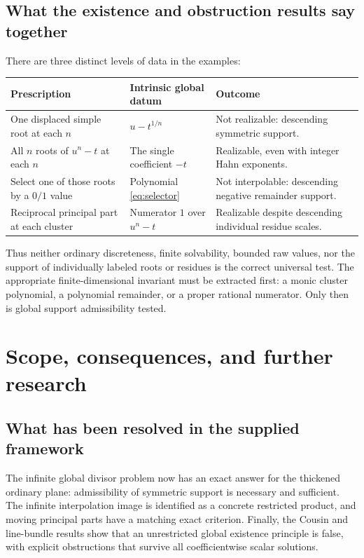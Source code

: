 \documentclass[11pt,letterpaper]{article}
\theoremstyle{definition}
\theoremstyle{remark}
\numberwithin{equation}{section}
\begin{document}
\subsection{What the existence and obstruction results say together}
There are three distinct levels of data in the examples:
\begin{center}
\begin{tabularx}{\textwidth}{@{}LLL@{}}
\toprule
Prescription & Intrinsic global datum & Outcome\\
\midrule
One displaced simple root at each $n$ & $u-t^{1/n}$ & Not realizable: descending symmetric support.\\[0.4em]
All $n$ roots of $u^n-t$ at each $n$ & The single coefficient $-t$ & Realizable, even with integer Hahn exponents.\\[0.4em]
Select one of those roots by a $0/1$ value & Polynomial \eqref{eq:selector} & Not interpolable: descending negative remainder support.\\[0.4em]
Reciprocal principal part at each cluster & Numerator $1$ over $u^n-t$ & Realizable despite descending individual residue scales.\\
\bottomrule
\end{tabularx}
\end{center}
Thus neither ordinary discreteness, finite solvability, bounded raw values, nor the support of individually labeled roots or residues is the correct universal test. The appropriate finite-dimensional invariant must be extracted first: a monic cluster polynomial, a polynomial remainder, or a proper rational numerator. Only then is global support admissibility tested.

\section{Scope, consequences, and further research}\label{sec:scope}

\subsection{What has been resolved in the supplied framework}
The infinite global divisor problem now has an exact answer for the thickened ordinary plane: admissibility of symmetric support is necessary and sufficient. The infinite interpolation image is identified as a concrete restricted product, and moving principal parts have a matching exact criterion. Finally, the Cousin and line-bundle results show that an unrestricted global existence principle is false, with explicit obstructions that survive all coefficientwise scalar solutions.
\end{document}
